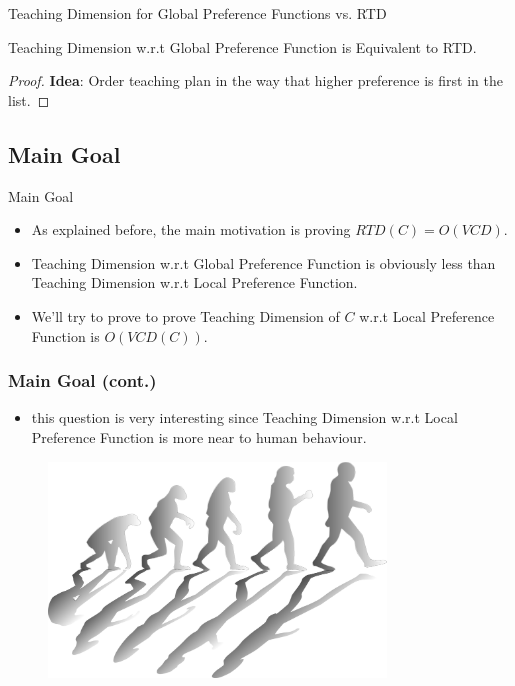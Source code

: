 \documentclass{beamer}
\begin{document}
\begin{frame}{Teaching Dimension for Global Preference Functions vs. RTD}

\begin{theorem}
Teaching Dimension w.r.t Global Preference Function is Equivalent to RTD.
\end{theorem}   
\begin{proof}
\textbf{Idea}: Order teaching plan in the way that higher preference is first in the list. 
\end{proof}

\end{frame}

\subsection{Main Goal}
\begin{frame}{Main Goal}
    \begin{itemize}
        \item  As explained before, the main motivation is proving $RTD(C) = O(VCD)$.
        \item Teaching Dimension w.r.t Global Preference Function is obviously less than Teaching Dimension w.r.t Local Preference Function.
        \item We'll try to prove to prove Teaching Dimension of $C$ w.r.t Local Preference Function is $O(VCD(C))$.
        
    \end{itemize}
   
\end{frame}
 
 
\begin{frame}
\frametitle{Main Goal (cont.)}
    \begin{itemize}
        \item this question is very interesting since Teaching Dimension w.r.t Local Preference Function is more near to human behaviour.
    \end{itemize}
    
    \begin{figure}[t]
    
    \centering
    \includegraphics[angle = 0, width=0.8\textwidth]{Figures/evolution.png}

    \end{figure}
   
\end{frame}
\end{document}
